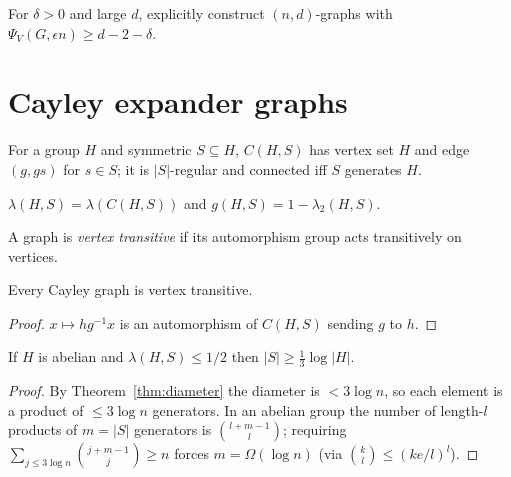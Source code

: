 \begin{theorem}
  \label{open:explicit-vertex-expansion}
  \notready
  For $\delta>0$ and large $d$, explicitly construct $(n,d)$-graphs with
  $\Psi_V(G,\epsilon n)\ge d-2-\delta$.
\end{theorem}


\chapter{Cayley expander graphs}

\begin{definition}
  \label{def:cayley-graph}
  For a group $H$ and symmetric $S\subseteq H$, $C(H,S)$ has vertex set $H$ and
  edge $(g,gs)$ for $s\in S$; it is $|S|$-regular and connected iff $S$
  generates $H$.
\end{definition}

\begin{definition}
  \label{def:lambda-cayley}
  $\lambda(H,S)=\lambda(C(H,S))$ and $g(H,S)=1-\lambda_2(H,S)$.
\end{definition}

\begin{definition}
  \label{def:vertex-transitive}
  A graph is \emph{vertex transitive} if its automorphism group acts
  transitively on vertices.
\end{definition}

\begin{claim}
  \label{claim:cayley-transitive}
  Every Cayley graph is vertex transitive.
\end{claim}
\begin{proof}
  $x\mapsto hg^{-1}x$ is an automorphism of $C(H,S)$ sending $g$ to $h$.
\end{proof}

\begin{proposition}
  \label{prop:abelian-generators}
  If $H$ is abelian and $\lambda(H,S)\le1/2$ then $|S|\ge\tfrac13\log|H|$.
\end{proposition}
\begin{proof}
  By Theorem~\ref{thm:diameter} the diameter is $<3\log n$, so each element is a
  product of $\le3\log n$ generators. In an abelian group the number of length-$l$
  products of $m=|S|$ generators is $\binom{l+m-1}l$; requiring
  $\sum_{j\le3\log n}\binom{j+m-1}j\ge n$ forces $m=\Omega(\log n)$ (via
  $\binom kl\le(ke/l)^l$).
\end{proof}

